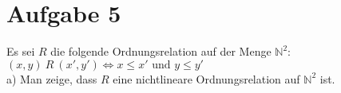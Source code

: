 \section*{Aufgabe 5}

Es sei $R$ die folgende Ordnungsrelation auf der Menge $\mathbb{N}^2$:\\
$(x,y) \ R \ (x',y') \Leftrightarrow x \leq x' \text{ und } y \leq y'$\\

a) Man zeige, dass $R$ eine nichtlineare Ordnungsrelation auf $\mathbb{N}^2$ ist.\\